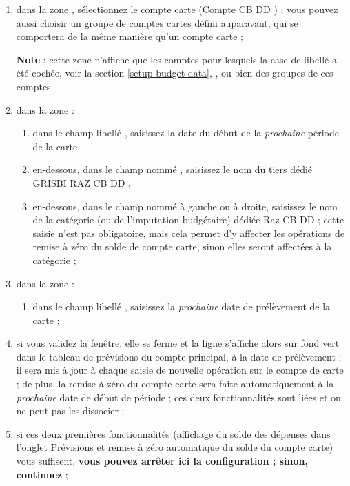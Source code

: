 \begin{enumerate}

	\item  dans la zone , sélectionnez le compte carte (\og Compte CB DD \fg{}) ; vous pouvez aussi choisir un groupe de comptes cartes défini auparavant, qui se comportera de la même manière qu'un compte carte ;

	\textbf{Note} : cette zone n'affiche que les comptes pour lesquels la case de libellé  a été cochée, voir la section \vref{setup-budget-data}, , ou bien des groupes de ces comptes.
	\item  dans la zone  :	 
		\begin{enumerate}
			\item dans le champ libellé , saisissez la date du début de la \emph{prochaine} période de la carte,
			\item  en-dessous, dans le champ nommé , saisissez le nom du tiers dédié \og GRISBI RAZ CB DD \fg{}, 	 
			\item en-dessous, dans le champ nommé  à gauche ou  à droite, saisissez le nom de la catégorie (ou de l'imputation budgétaire) dédiée \og Raz CB DD \fg{} ; cette saisie n'est pas obligatoire, mais cela permet d'y affecter les opérations de remise à zéro du solde de compte carte, sinon elles seront affectées à la catégorie  ;
		\end{enumerate}				
	\item  dans la zone  :
		\begin{enumerate}
			\item  dans le champ libellé , saisissez la \emph{prochaine} date de prélèvement de la carte ;		
		\end{enumerate}			 	  
	\item  si vous validez la fenêtre, elle se ferme et la ligne  s'affiche alors sur fond vert{\couleur} dans le tableau de prévisions du compte principal, à la date de prélèvement ; il sera mis à jour à chaque saisie de nouvelle opération sur le compte de carte ; de plus, la remise à zéro du compte carte sera faite automatiquement à la \emph{prochaine} date de début de période ; ces deux fonctionnalités sont liées et on ne peut pas les dissocier ; 
	\item  si ces deux premières fonctionnalités (affichage du solde des dépenses dans l'onglet \menu{}Prévisions et remise à zéro automatique du solde du compte carte) vous suffisent, \textbf{vous pouvez arrêter ici la configuration ; sinon, continuez} ;


\end{enumerate}
